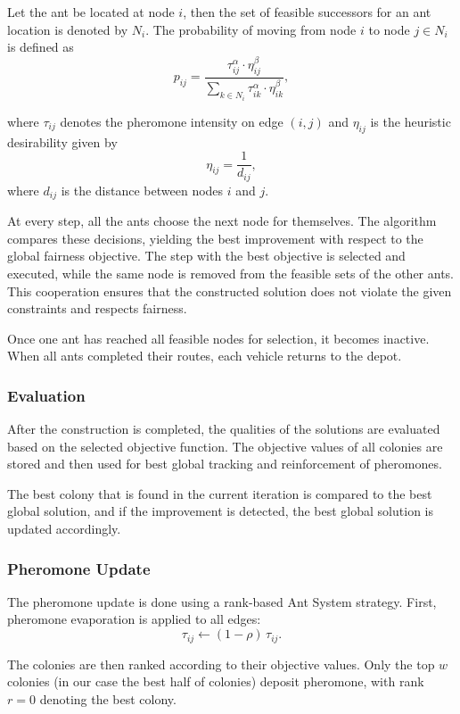 \documentclass[12pt]{article}
\begin{document}
Let the ant be located at node $i$, then the set of feasible successors for an ant location is denoted by $N_i$. The probability of moving from node $i$ to node $j \in N_i$ is defined as
\[
p_{ij}
=
\frac{\tau_{ij}^{\alpha} \cdot \eta_{ij}^{\beta}}
{\displaystyle \sum_{k \in N_i} \tau_{ik}^{\alpha} \cdot \eta_{ik}^{\beta}},
\]

where $\tau_{ij}$ denotes the pheromone intensity on edge $(i,j)$ and
$\eta_{ij}$ is the heuristic desirability given by
\[
\eta_{ij} = \frac{1}{d_{ij}},
\]
where $d_{ij}$ is the  distance between nodes $i$ and $j$.

At every step, all the ants choose the next node for themselves. The algorithm compares these decisions, yielding the best improvement with respect to the global fairness objective. The step with the best objective is selected and executed, while the same node is removed from the feasible sets of the other ants. This cooperation ensures that the constructed solution does not violate the given constraints and respects fairness. 

Once one ant has reached all feasible nodes for selection, it becomes inactive. When all ants completed their routes, each vehicle returns to the depot.

\subsubsection{Evaluation}

After the construction is completed, the qualities of the solutions are evaluated based on the selected objective function. The objective values of all colonies are stored and then used for best global tracking and reinforcement of pheromones.

The best colony that is found in the current iteration is compared to the best global solution, and if the improvement is detected, the best global solution is updated accordingly.

\subsubsection{Pheromone Update}

The pheromone update is done using a rank-based Ant System strategy.
First, pheromone evaporation is applied to all edges:
\[
\tau_{ij} \leftarrow (1 - \rho)\,\tau_{ij}.
\]

The colonies are then ranked according to their objective values.
Only the top $w$ colonies (in our case the best half of colonies) deposit pheromone, with rank $r = 0$ denoting the best colony.
\end{document}
